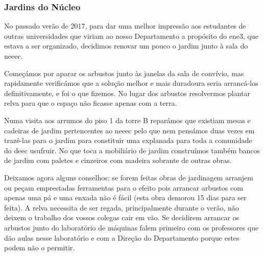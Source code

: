 
\subsubsection{Jardins do Núcleo}

No passado verão de 2017, para dar uma melhor impressão aos estudantes de outras universidades que viriam ao nosso Departamento a propósito do \acrshort{ene3}, que estava a ser organizado, decidimos renovar um pouco o jardim junto à sala do \acrshort{neeec}.

Começámos por aparar os arbustos junto às janelas da sala de convívio, mas rapidamente verificámos que a solução melhor e mais duradoura seria arrancá-los definitivamente, e foi o que fizemos. No lugar dos arbustos resolvermos plantar relva para que o espaço não ficasse apenas com a terra.

Numa visita aos arrumos do piso 1 da torre B reparámos que existiam mesas e cadeiras de jardim pertencentes ao \acrshort{neeec} pelo que nem pensámos duas vezes em trazê-las para o jardim para constituir uma explanada para toda a comunidade do \acrshort{deec} usufruir. No que toca a mobiliário de jardim construímos também bancos de jardim com paletes e cinzeiros com madeira sobrante de outras obras.

Deixamos agora alguns conselhos: se forem feitas obras de jardinagem arranjem ou peçam emprestadas ferramentas para o efeito pois arrancar arbustos com apenas uma pá e uma enxada não é fácil (esta obra demorou 15 dias para ser feita). A relva necessita de ser regada, principalmente durante o verão, não deixem o trabalho dos vossos colegas cair em vão. Se decidirem arrancar os arbustos junto do laboratório de máquinas falem primeiro com os professores que dão aulas nesse laboratório e com a Direção do Departamento porque estes podem não o permitir.